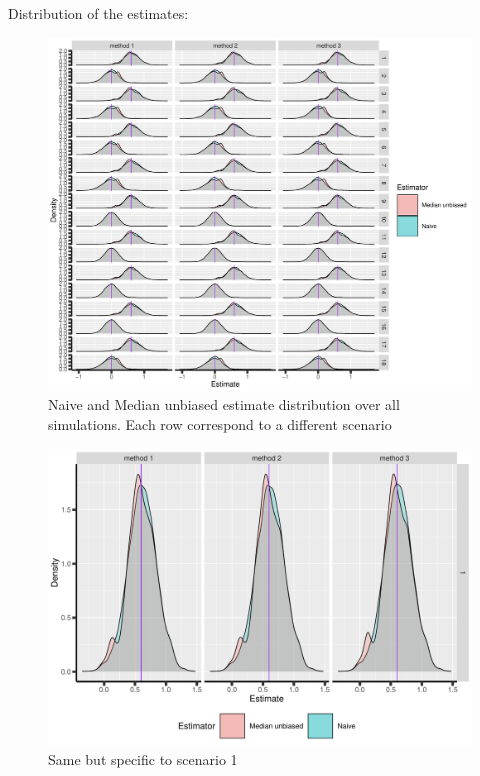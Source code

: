 \documentclass[12pt]{article}
\begin{document}
Distribution of the estimates:
\begin{figure}[!h]
\centering
\includegraphics[trim={0 0 0 0},width=1\textwidth]{./figures/gg-estimate-density.pdf}
\caption{Naive and Median unbiased estimate distribution over all simulations. Each row correspond to a different scenario}
\end{figure}

\begin{figure}[!h]
\centering
\includegraphics[trim={0 0 0 0},width=\textwidth]{./figures/gg-estimate-density-scenario1.pdf}
\caption{Same but specific to scenario 1}
\end{figure}
\end{document}
